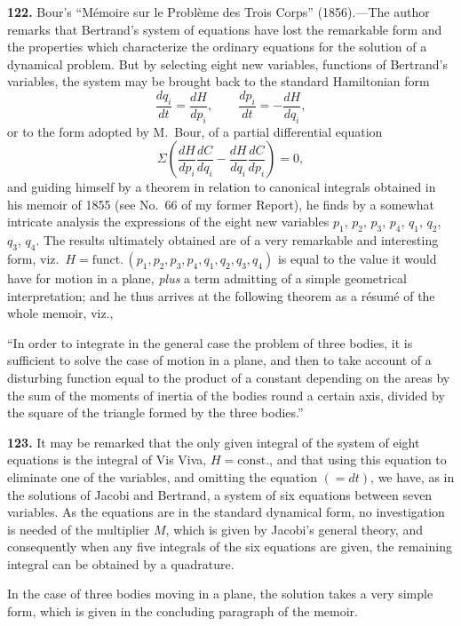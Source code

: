 \documentclass[11pt,a4paper]{book}
\begin{document}
\textbf{122.} Bour's ``M\'emoire sur le Probl\`eme des Trois Corps'' (1856).---The author remarks that Bertrand's system of equations have lost the remarkable form and the properties which characterize the ordinary equations for the solution of a dynamical problem. But by selecting eight new variables, functions of Bertrand's variables, the system may be brought back to the standard Hamiltonian form
\[
\frac{dq_i}{dt} = \frac{dH}{dp_i}, \qquad \frac{dp_i}{dt} = -\frac{dH}{dq_i},
\]
or to the form adopted by M.~Bour, of a partial differential equation
\[
\Sigma\left(\frac{dH}{dp_i}\frac{dC}{dq_i} - \frac{dH}{dq_i}\frac{dC}{dp_i}\right) = 0,
\]
and guiding himself by a theorem in relation to canonical integrals obtained in his memoir of 1855 (see No.~66 of my former Report), he finds by a somewhat intricate analysis the expressions of the eight new variables $p_1$, $p_2$, $p_3$, $p_4$, $q_1$, $q_2$, $q_3$, $q_4$. The results ultimately obtained are of a very remarkable and interesting form, viz.\ $H = \text{funct.}\,(p_1, p_2, p_3, p_4, q_1, q_2, q_3, q_4)$ is equal to the value it would have for motion in a plane, \textit{plus} a term admitting of a simple geometrical interpretation; and he thus arrives at the following theorem as a r\'esum\'e of the whole memoir, viz.,

``In order to integrate in the general case the problem of three bodies, it is sufficient to solve the case of motion in a plane, and then to take account of a disturbing function equal to the product of a constant depending on the areas by the sum of the moments of inertia of the bodies round a certain axis, divided by the square of the triangle formed by the three bodies.''

\textbf{123.} It may be remarked that the only given integral of the system of eight equations is the integral of Vis Viva, $H = \text{const.}$, and that using this equation to eliminate one of the variables, and omitting the equation $(=dt)$, we have, as in the solutions of Jacobi and Bertrand, a system of six equations between seven variables. As the equations are in the standard dynamical form, no investigation is needed of the multiplier $M$, which is given by Jacobi's general theory, and consequently when any five integrals of the six equations are given, the remaining integral can be obtained by a quadrature.

In the case of three bodies moving in a plane, the solution takes a very simple form, which is given in the concluding paragraph of the memoir.
\end{document}
